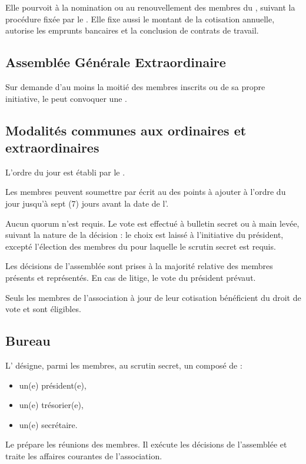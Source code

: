 \documentclass[a4paper,french,10pt]{article}
\newcommand{\article}[1]{\subsection{#1}\addtocounter{article}{1}}
\newcounter{article}
\begin{document}
Elle pourvoit à la nomination ou au renouvellement des membres du \bureau{}, suivant la procédure fixée par le \RI{}. Elle fixe aussi le montant de la cotisation annuelle, autorise les emprunts bancaires et la conclusion de contrats de travail.


\article{Assemblée Générale Extraordinaire}
\label{sec:age}

Sur demande d'au moins la moitié des membres inscrits ou de sa propre initiative, le \bureau{} peut convoquer une \AGE{}.

\article{Modalités communes aux \AGs{} ordinaires et extraordinaires}
\label{sec:ag}
L'ordre du jour est établi par le \bureau{}. %

Les membres peuvent soumettre par écrit au \bureau{} des points à ajouter à l'ordre du jour jusqu'à sept (7) jours avant la date de l'\AG{}.


Aucun quorum n'est requis. Le vote est effectué à bulletin secret ou à
main levée, suivant la nature de la décision : le choix est laissé à
l'initiative du président, excepté l'élection des membres du \bureau{}
pour laquelle le scrutin secret est requis.

Les décisions de l’assemblée sont prises à la majorité relative des
membres présents et représentés. En cas de litige, le vote du
président prévaut.

Seuls les membres de l’association à jour de leur cotisation
bénéficient du droit de vote et sont éligibles.





\article{Bureau}
\label{sec:bureau}
L’\AG{} désigne, parmi les membres, au scrutin secret, un
\bureau{} composé de :
\begin{itemize}
\item un(e) président(e),
  
\item un(e) trésorier(e),

\item un(e) secrétaire.
\end{itemize}

Le \bureau{} prépare les réunions des membres. Il exécute les décisions de l’assemblée et traite les affaires courantes de l’association.
\end{document}
